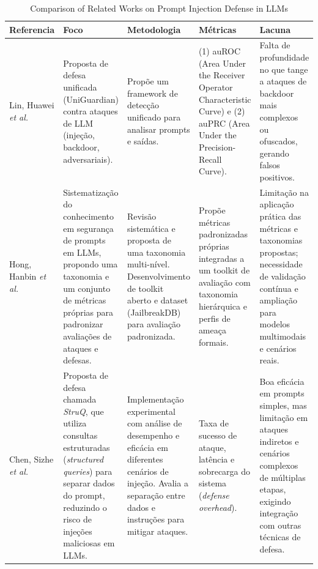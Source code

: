 \begin{longtable}{
      >{\raggedright\arraybackslash}p{}
      >{\raggedright\arraybackslash}p{}
      >{\raggedright\arraybackslash}p{}
      >{\raggedright\arraybackslash}p{}
      >{\raggedright\arraybackslash}p{}}
\caption{Comparison of Related Works on Prompt Injection Defense in LLMs}
\label{tab:related_works}
\\
\toprule
\textbf{Referencia} & \textbf{Foco} & \textbf{Metodologia} & \textbf{Métricas} & \textbf{Lacuna} \\
\midrule
\endfirsthead

      Lin, Huawei \emph{et al.} \cite{Lin2025UniGuardian} 
      & Proposta de defesa unificada (UniGuardian) contra ataques de LLM (injeção, backdoor, adversariais).
      & Propõe um framework de detecção unificado para analisar prompts e saídas.
      & (1) auROC (Area Under the Receiver Operator Characteristic Curve) e (2) auPRC (Area Under the Precision-Recall Curve).
      & Falta de profundidade no que tange a ataques de backdoor mais complexos ou ofuscados, gerando falsos positivos. \\
    \midrule
      Hong, Hanbin \emph{et al.} \cite{Hong2025SystematizationOfKnowledge} 
      & Sistematização do conhecimento em segurança de prompts em LLMs, propondo uma taxonomia e um conjunto de métricas próprias para padronizar avaliações de ataques e defesas.
      & Revisão sistemática e proposta de uma taxonomia multi-nível. Desenvolvimento de toolkit aberto e dataset (JailbreakDB) para avaliação padronizada.
      & Propõe métricas padronizadas próprias integradas a um toolkit de avaliação com taxonomia hierárquica e perfis de ameaça formais.
      & Limitação na aplicação prática das métricas e taxonomias propostas; necessidade de validação contínua e ampliação para modelos multimodais e cenários reais. \\
    \midrule
      Chen, Sizhe \emph{et al.} \cite{Chen2025StruQ}
      & Proposta de defesa chamada \textit{StruQ}, que utiliza consultas estruturadas (\textit{structured queries}) para separar dados do prompt, reduzindo o risco de injeções maliciosas em LLMs.
      & Implementação experimental com análise de desempenho e eficácia em diferentes cenários de injeção. Avalia a separação entre dados e instruções para mitigar ataques.
      & Taxa de sucesso de ataque, latência e sobrecarga do sistema (\textit{defense overhead}).
      & Boa eficácia em prompts simples, mas limitação em ataques indiretos e cenários complexos de múltiplas etapas, exigindo integração com outras técnicas de defesa. \\
      

\end{longtable}
